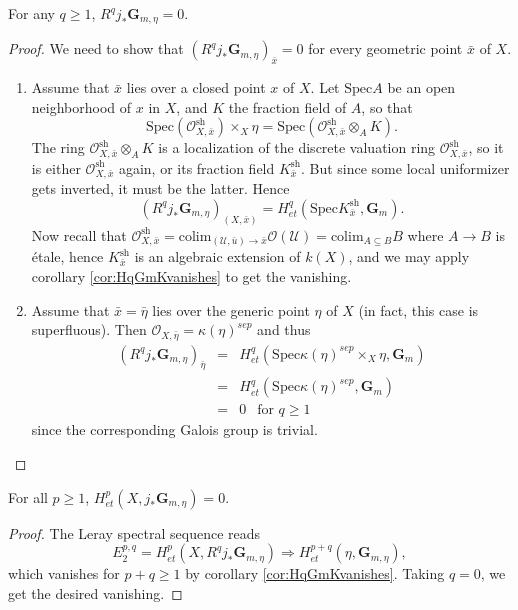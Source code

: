 \begin{lemma}
For any $q \geq 1$, $R^q j_*\mathbf{G}_{m,\eta} = 0$.
\end{lemma}

\begin{proof}
We need to show that $(R^q j_*\mathbf{G}_{m,\eta})_{\bar x} = 0$ for every 
geometric point $\bar x$ of $X$. 
\begin{enumerate}
\item
Assume that $\bar x$ lies over a closed point $x$ of $X$. Let $\text{Spec} A$ 
be an open neighborhood of $x$ in $X$, and $K$ the fraction field of $A$, so 
that
$$
\text{Spec}(\mathcal{O}^\text{sh}_{X,\bar x}) \times_X \eta = 
\text{Spec}(\mathcal{O}^\text{sh}_{X,\bar x} \otimes_A K).
$$
The ring $\mathcal{O}^\text{sh}_{X,\bar x} \otimes_A K$ is a localization of 
the discrete valuation ring $\mathcal{O}^\text{sh}_{X,\bar x}$, so it is either 
$\mathcal{O}^\text{sh}_{X,\bar x}$ again, or its fraction field 
$K^\text{sh}_{\bar x}$. But since some local uniformizer gets inverted, it must 
be the latter. Hence
$$
(R^q j_*\mathbf{G}_{m,\eta})_{(X, \bar x)} = H_{et}^q(\text{Spec} 
K^\text{sh}_{\bar x}, \mathbf{G}_m).
$$
Now recall that $\mathcal{O}^\text{sh}_{X, \bar x} = 
\text{colim}_{(\mathcal{U},\bar u) \to \bar x} \mathcal{O} (\mathcal{U}) = 
\text{colim}_{A \subseteq B} B$ where $A \to B$ is \'etale, hence 
$K^\text{sh}_{\bar x}$ is an algebraic extension of $k(X)$, and we may apply 
corollary \ref{cor:HqGmKvanishes} to get the vanishing.
\item
Assume that $\bar x = \bar \eta$ lies over the generic point $\eta$ of $X$ (in 
fact, this case is superfluous). Then $\mathcal{O}_{X,\bar \eta} = 
\kappa(\eta)^{sep}$ and thus
\begin{eqnarray*}
(R^q j_*\mathbf{G}_{m,\eta})_{\bar \eta}
& = &
H_{et}^q(\text{Spec} \kappa(\eta)^{sep} \times_X \eta, \mathbf{G}_m) \\
& = & H_{et}^q (\text{Spec} \kappa(\eta)^{sep}, \mathbf{G}_m)  \\
& = & 0 \ \ \text{ for } q \geq 1
\end{eqnarray*}
since the corresponding Galois group is trivial.
\end{enumerate}
\end{proof}

\begin{lemma}
For all $p \geq 1$, $H_{et}^p(X, j_*\mathbf{G}_{m,\eta}) = 0$.
\end{lemma}

\begin{proof}
The Leray spectral sequence reads
$$
E_2^{p,q} = H_{et}^p(X, R^qj_*\mathbf{G}_{m,\eta}) \Rightarrow 
H_{et}^{p+q}(\eta, \mathbf{G}_{m,\eta}),
$$
which vanishes for $p+q \geq 1$ by corollary \ref{cor:HqGmKvanishes}. Taking $q 
= 0$, we get the desired vanishing.
\end{proof}

